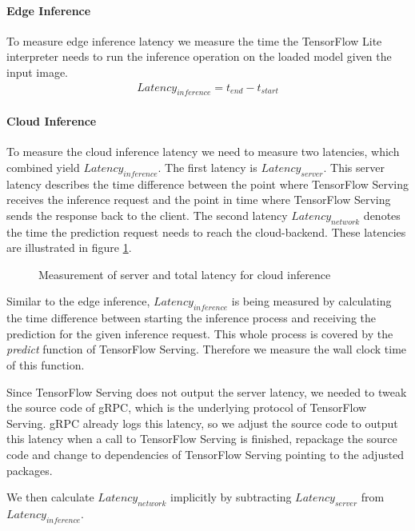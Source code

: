 \paragraph{Edge Inference}To measure edge inference latency we measure the time the TensorFlow Lite interpreter needs to run the inference operation on the loaded model given the input image.
\begin{equation*}
\begin{gathered}
Latency_{inference} = t_{end} - t_{start}
\end{gathered}
\end{equation*}
\paragraph{Cloud Inference}
To measure the cloud inference latency we need to measure two latencies, which combined yield $Latency_{inference}$. The first latency is  $Latency_{server}$. This server latency describes the time difference between the point where TensorFlow Serving receives the inference request and the point in time where TensorFlow Serving sends the response back to the client.
The second latency $Latency_{network}$ denotes the time the prediction request needs to reach the cloud-backend.
These latencies are illustrated in figure \ref{fig:serverLat}.
\begin{figure}[!htb]
\centering

\caption{Measurement of server and total latency for cloud inference}
\label{fig:serverLat}
\end{figure}


Similar to the edge inference, $Latency_{inference}$ is being measured by calculating the time difference between starting the inference process and receiving the prediction for the given inference request. This whole process is covered by the \emph{predict} function of TensorFlow Serving. Therefore we measure the wall clock time of this function.

Since TensorFlow Serving does not output the server latency, we needed to tweak the source code of gRPC, which is the underlying protocol of TensorFlow Serving. gRPC already logs this latency, so we adjust the source code to output this latency when a call to TensorFlow Serving is finished, repackage the source code and change to dependencies of TensorFlow Serving pointing to the adjusted packages.

We then calculate $Latency_{network}$ implicitly by subtracting $Latency_{server}$ from $Latency_{inference}$.

